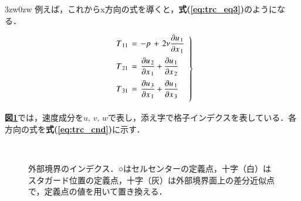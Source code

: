 \begin{indentation}{3zw}{0zw}
\noindent 例えば，これからx方向の式を導くと，\textbf{式(\ref{eq:trc_eq3})}のようになる．

\begin{equation}
\left .
\begin{array}{l}
\vspace{2mm}
\displaystyle{ T_{\,11} \,=\, -p \,+\, 2 \nu \frac{\partial u_{\,1}}{\partial x_{\,1}} }\\
\vspace{2mm}
\displaystyle{ T_{\,21} \,=\, \frac{\partial u_{\,2}}{\partial x_{\,1}} + \frac{\partial u_{\,1}}{\partial x_{\,2}} }\\
\vspace{2mm}
\displaystyle{ T_{\,31} \,=\, \frac{\partial u_{\,3}}{\partial x_{\,1}} + \frac{\partial u_{\,1}}{\partial x_{\,3}} } 
\end{array}
\right \}
\label{eq:trc_eq3}
\end{equation}

\noindent \textbf{図\ref{fig:x-trc}}では，速度成分を$u,\,v,\,w$で表し，添え字で格子インデクスを表している．各方向の式を\textbf{式(\ref{eq:trc_cnd})}に示す．

\begin{figure}[htbp]
\begin{center}
~
\caption{外部境界のインデクス．○はセルセンターの定義点，十字（白）はスタガード位置の定義点，十字（灰）は外部境界面上の差分近似点で，定義点の値を用いて置き換える．} 
\label{fig:x-trc}
\end{center}
\end{figure}


\end{indentation}
